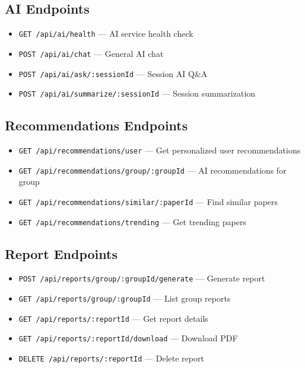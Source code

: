 \documentclass[11pt,a4paper]{article}
\begin{document}
\subsection{AI Endpoints}

\begin{itemize}
    \item \texttt{GET /api/ai/health} --- AI service health check
    \item \texttt{POST /api/ai/chat} --- General AI chat
    \item \texttt{POST /api/ai/ask/:sessionId} --- Session AI Q\&A
    \item \texttt{POST /api/ai/summarize/:sessionId} --- Session summarization
\end{itemize}

\subsection{Recommendations Endpoints}

\begin{itemize}
    \item \texttt{GET /api/recommendations/user} --- Get personalized user recommendations
    \item \texttt{GET /api/recommendations/group/:groupId} --- AI recommendations for group
    \item \texttt{GET /api/recommendations/similar/:paperId} --- Find similar papers
    \item \texttt{GET /api/recommendations/trending} --- Get trending papers
\end{itemize}

\subsection{Report Endpoints}

\begin{itemize}
    \item \texttt{POST /api/reports/group/:groupId/generate} --- Generate report
    \item \texttt{GET /api/reports/group/:groupId} --- List group reports
    \item \texttt{GET /api/reports/:reportId} --- Get report details
    \item \texttt{GET /api/reports/:reportId/download} --- Download PDF
    \item \texttt{DELETE /api/reports/:reportId} --- Delete report
\end{itemize}
\end{document}
